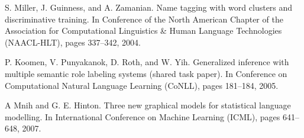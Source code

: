 \documentclass{article} %
\begin{document}
\noindent [7.] S. Miller, J. Guinness, and A. Zamanian. Name tagging with word clusters and discriminative training. In Conference of the North American Chapter of the Association for Computational Linguistics \& Human Language Technologies (NAACL-HLT), pages 337--342, 2004. 

\noindent [8.] P. Koomen, V. Punyakanok, D. Roth, and W. Yih. Generalized inference with multiple semantic role labeling systems (shared task paper). In Conference on Computational Natural Language Learning (CoNLL), pages 181--184, 2005.

\noindent [9.] A Mnih and G. E. Hinton. Three new graphical models for statistical language modelling. In International Conference on Machine Learning (ICML), pages 641--648, 2007. 
\end{document}
